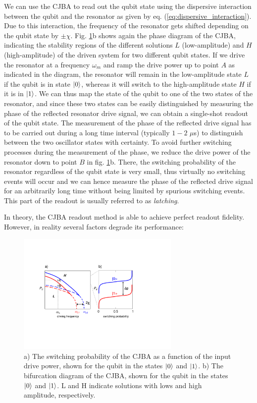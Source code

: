 We can use the CJBA to read out the qubit state using the dispersive interaction between the qubit and the resonator as given by eq. (\ref{eq:dispersive_interaction}). Due to this interaction, the frequency of the resonator gets shifted depending on the qubit state by $\pm\chi$. Fig. \ref{fig:readout_process_illustration}b shows again the phase diagram of the CJBA, indicating the stability regions of the different solutions $L$ (low-amplitude) and $H$ (high-amplitude) of the driven system for two different qubit states. If we drive the resonator at a frequency $\omega_m$ and ramp the drive power up to point $A$ as indicated in the diagram, the resonator will remain in the low-amplitude state $L$ if the qubit is in state $\left| 0 \right>$, whereas it will switch to the high-amplitude state $H$ if it is in $\left| 1 \right>$. We can thus map the state of the qubit to one of the two states of the resonator, and since these two states can be easily distinguished by measuring the phase of the reflected resonator drive signal, we can obtain a single-shot readout of the qubit state. The measurement of the phase of the reflected drive signal has to be carried out during a long time interval (typically $1-2$ $\mu$s) to distinguish between the two oscillator states with certainty. To avoid further switching processes during the measurement of the phase, we reduce the drive power of the resonator down to point $B$ in fig. \ref{fig:readout_process_illustration}b. There, the switching probability of the resonator regardless of the qubit state is very small, thus virtually no switching events will occur and we can hence measure the phase of the reflected drive signal for an arbitrarily long time without being limited by spurious switching events. This part of the readout is usually referred to as {\it latching}. 

\smallskip

In theory, the CJBA readout method is able to achieve perfect readout fidelity. However, in reality several factors degrade its performance:

\begin{figure}
	\includegraphics[width=0.7\textwidth]{./material/figures/2-qubit-processor/readout_principle}
	\caption[]{a) The switching probability of the CJBA as a function of the input drive power, shown for the qubit in the states $\left| 0 \right>$ and $\left| 1 \right>$. b) The bifurcation diagram of the CJBA, shown for the qubit in the states $\left| 0 \right>$ and $\left| 1 \right>$. L and H indicate solutions with lows and high amplitude, respectively.}
	\label{fig:readout_process_illustration}
\end{figure}


